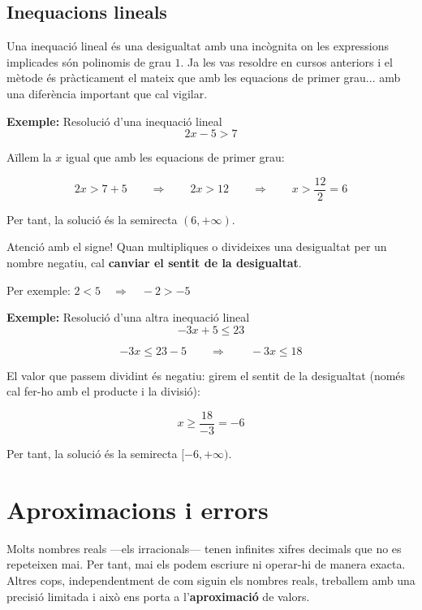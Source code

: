 \subsection{Inequacions lineals}

Una inequació lineal és una desigualtat amb una incògnita on les expressions implicades són polinomis de grau $1$. Ja les vas resoldre en cursos anteriors i el mètode és pràcticament el mateix que amb les equacions de primer grau... amb una diferència important que cal vigilar.

\begin{exemple}{\textbf{Exemple:} Resolució d'una inequació lineal}
\[
2x-5>7
\]

Aïllem la $x$ igual que amb les equacions de primer grau:

\[
2x > 7 + 5 \qquad\Rightarrow\qquad 2x > 12 \qquad\Rightarrow\qquad x > \frac{12}{2} = 6
\]

Per tant, la solució és la semirecta $(6,+\infty)$.
\end{exemple}

\begin{nota}{Atenció amb el signe!}
Quan multipliques o divideixes una desigualtat per un nombre negatiu, cal \textbf{canviar el sentit de la desigualtat}.

Per exemple: $2 < 5 \quad \Longrightarrow \quad -2 > -5$
\end{nota}

\begin{exemple}{\textbf{Exemple:} Resolució d'una altra inequació lineal}
\[
-3x + 5 \leq 23
\]

\[
-3x \leq 23 - 5 \qquad\Rightarrow\qquad -3x \leq 18
\]

El valor que passem dividint és negatiu: girem el sentit de la desigualtat (només cal fer-ho amb el producte i la divisió):

\[
x \geq \frac{18}{-3} = -6
\]

Per tant, la solució és la semirecta $[-6,+\infty)$.
\end{exemple}

\section{Aproximacions i errors}

Molts nombres reals —els irracionals— tenen infinites xifres decimals que no es repeteixen mai. Per tant, mai els podem escriure ni operar-hi de manera exacta. Altres cops, independentment de com siguin els nombres reals, treballem amb una precisió limitada i això ens porta a l'\textbf{aproximació} de valors.

